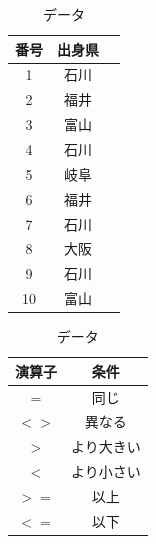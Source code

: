 \begin{table}
\begin{minipage}{0.5\hsize}
    \centering
    \makeatletter
    \def\@captype{table}
    \makeatother
    \caption{データ}
    \begin{tabular}{|c|c|c|}
      \hline
      番号& 出身県\\ \hline
      1   & 石川  \\ \hline
      2   & 福井  \\ \hline
      3   & 富山  \\ \hline
      4   & 石川  \\ \hline
      5   & 岐阜  \\ \hline
      6   & 福井  \\ \hline
      7   & 石川  \\ \hline
      8   & 大阪  \\ \hline
      9   & 石川  \\ \hline
      10  & 富山  \\ \hline
    \end{tabular}
    \label{tab:countif}
\end{minipage}
\begin{minipage}{0.5\hsize}
    \centering
    \makeatletter
    \def\@captype{table}
    \makeatother
    \caption{データ}
    \begin{tabular}{|c|c|}
      演算子 & 条件\\ \hline
      $=$      & 同じ\\ \hline
      $<>$     & 異なる\\ \hline
      $>$      & より大きい\\ \hline
      $<$      & より小さい\\ \hline
      $>=$     & 以上\\ \hline
      $<=$     & 以下\\ \hline
    \end{tabular}
    \label{tab:countif_operator}
\end{minipage}
\end{table}


